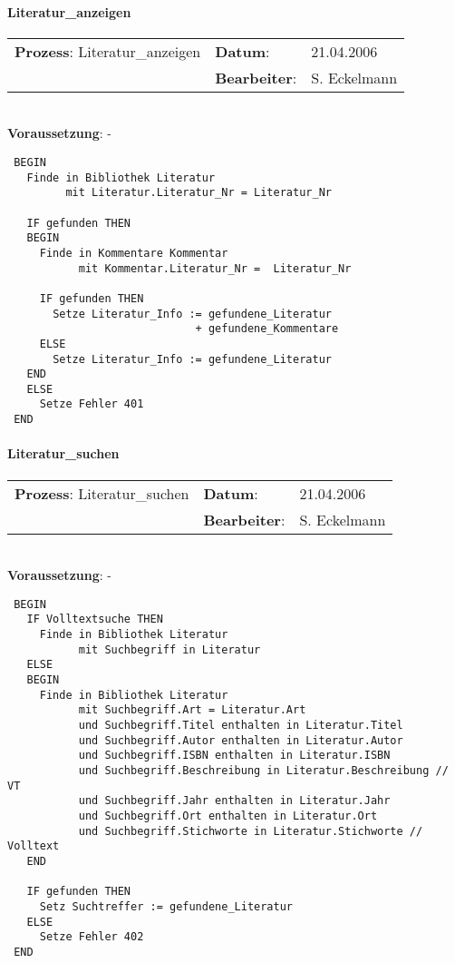 \paragraph{Literatur\_anzeigen}
\begin{tabular}[t]{p{9.5cm}ll}
\textbf{Prozess}: Literatur\_anzeigen  	&\textbf{Datum}:      &21.04.2006\\
					&\textbf{Bearbeiter}: &S. Eckelmann\\
\end{tabular}

\hrulefill\\
\textbf{Voraussetzung}: -
\begin{verbatim}
 BEGIN
   Finde in Bibliothek Literatur
         mit Literatur.Literatur_Nr = Literatur_Nr

   IF gefunden THEN
   BEGIN
     Finde in Kommentare Kommentar
           mit Kommentar.Literatur_Nr =  Literatur_Nr

     IF gefunden THEN
       Setze Literatur_Info := gefundene_Literatur
                             + gefundene_Kommentare
     ELSE
       Setze Literatur_Info := gefundene_Literatur
   END
   ELSE
     Setze Fehler 401
 END
\end{verbatim}
\hrulefill


\paragraph{Literatur\_suchen}
\begin{tabular}[t]{p{9.5cm}ll}
\textbf{Prozess}: Literatur\_suchen  	&\textbf{Datum}:      &21.04.2006\\
					&\textbf{Bearbeiter}: &S. Eckelmann\\
\end{tabular}

\hrulefill\\
\textbf{Voraussetzung}: -
\begin{verbatim}
 BEGIN
   IF Volltextsuche THEN
     Finde in Bibliothek Literatur
           mit Suchbegriff in Literatur
   ELSE
   BEGIN
     Finde in Bibliothek Literatur
           mit Suchbegriff.Art = Literatur.Art
           und Suchbegriff.Titel enthalten in Literatur.Titel
           und Suchbegriff.Autor enthalten in Literatur.Autor
           und Suchbegriff.ISBN enthalten in Literatur.ISBN
           und Suchbegriff.Beschreibung in Literatur.Beschreibung // VT
           und Suchbegriff.Jahr enthalten in Literatur.Jahr
           und Suchbegriff.Ort enthalten in Literatur.Ort
           und Suchbegriff.Stichworte in Literatur.Stichworte // Volltext
   END
   
   IF gefunden THEN
     Setz Suchtreffer := gefundene_Literatur
   ELSE
     Setze Fehler 402
 END
\end{verbatim}
\hrulefill
